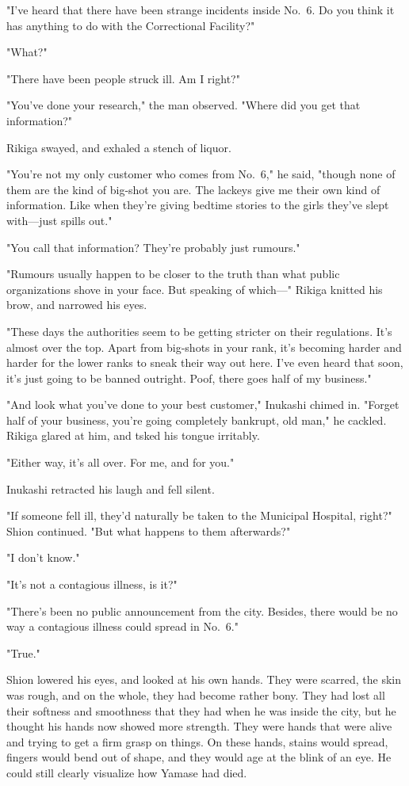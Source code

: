 "I've heard that there have been strange incidents inside No.~6. Do you
think it has anything to do with the Correctional Facility?"

"What?"

"There have been people struck ill. Am I right?"

"You've done your research," the man observed. "Where did you get that
information?"

Rikiga swayed, and exhaled a stench of liquor.

"You're not my only customer who comes from No.~6," he said, "though
none of them are the kind of big-shot you are. The lackeys give me their
own kind of information. Like when they're giving bedtime stories to the
girls they've slept with---just spills out."

"You call that information? They're probably just rumours."

"Rumours usually happen to be closer to the truth than what public
organizations shove in your face. But speaking of which---" Rikiga knitted
his brow, and narrowed his eyes.

"These days the authorities seem to be getting stricter on their
regulations. It's almost over the top. Apart from big-shots in your
rank, it's becoming harder and harder for the lower ranks to sneak their
way out here. I've even heard that soon, it's just going to be banned
outright. Poof, there goes half of my business."

"And look what you've done to your best customer," Inukashi chimed in.
"Forget half of your business, you're going completely bankrupt, old
man," he cackled. Rikiga glared at him, and tsked his tongue irritably.

"Either way, it's all over. For me, and for you."

Inukashi retracted his laugh and fell silent.

"If someone fell ill, they'd naturally be taken to the Municipal
Hospital, right?" Shion continued. "But what happens to them
afterwards?"

"I don't know."

"It's not a contagious illness, is it?"

"There's been no public announcement from the city. Besides, there would
be no way a contagious illness could spread in No.~6."

"True."

Shion lowered his eyes, and looked at his own hands. They were scarred,
the skin was rough, and on the whole, they had become rather bony. They
had lost all their softness and smoothness that they had when he was
inside the city, but he thought his hands now showed more strength. They
were hands that were alive and trying to get a firm grasp on things. On
these hands, stains would spread, fingers would bend out of shape, and
they would age at the blink of an eye. He could still clearly visualize
how Yamase had died.

